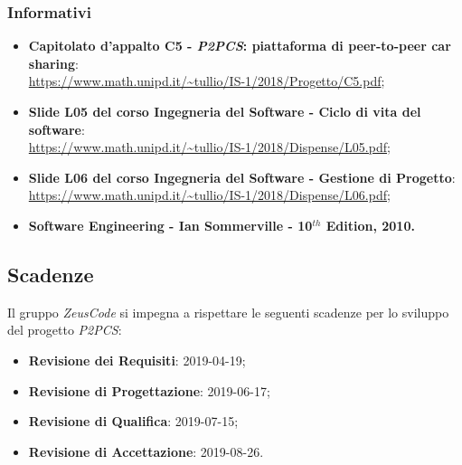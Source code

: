 \subsubsection{Informativi}
\begin{itemize}
	\item \textbf{Capitolato d'appalto C5 - \textit{P2PCS}: piattaforma di peer-to-peer car sharing}: \\
	\url{https://www.math.unipd.it/~tullio/IS-1/2018/Progetto/C5.pdf};
	\item \textbf{Slide L05 del corso Ingegneria del Software - Ciclo di vita 
		del software}:\\
	\url{https://www.math.unipd.it/~tullio/IS-1/2018/Dispense/L05.pdf};
	\item \textbf{Slide L06 del corso Ingegneria del Software - Gestione di 
	Progetto}: \\
	\url{https://www.math.unipd.it/~tullio/IS-1/2018/Dispense/L06.pdf};
	\item \textbf{Software Engineering - Ian Sommerville - 10$^{th}$ Edition, 
	2010.}
\end{itemize}

\hypertarget{scadenze}{\subsection{Scadenze}}
Il gruppo \textit{ZeusCode} si impegna a rispettare le seguenti scadenze per lo 
sviluppo del progetto \textit{P2PCS}:

\begin{itemize}
	\item \textbf{Revisione dei Requisiti}: 2019-04-19;
	\item \textbf{Revisione di Progettazione}: 2019-06-17;
	\item \textbf{Revisione di Qualifica}: 2019-07-15;
	\item \textbf{Revisione di Accettazione}: 2019-08-26.
\end{itemize}